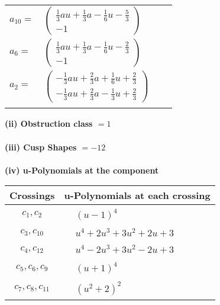 \documentclass[1p]{elsarticle_modified}
\theoremstyle{definition}
\begin{document}
\begin{tabular}{m{7pt} m{180pt} m{7pt} m{180pt} }
\flushright $a_{10}=$&$\begin{pmatrix}\frac{1}{3} a u+\frac{1}{3} a-\frac{1}{6} u-\frac{5}{3}\\-1\end{pmatrix}$ \\
\flushright $a_{6}=$&$\begin{pmatrix}\frac{1}{3} a u+\frac{1}{3} a-\frac{1}{6} u-\frac{2}{3}\\-1\end{pmatrix}$ \\
\flushright $a_{2}=$&$\begin{pmatrix}-\frac{1}{3} a u+\frac{2}{3} a+\frac{1}{6} u+\frac{2}{3}\\-\frac{1}{3} a u+\frac{2}{3} a-\frac{1}{3} u+\frac{2}{3}\end{pmatrix}$\\&\end{tabular}
\flushleft \textbf{(ii) Obstruction class $= 1$}\\~\\
\flushleft \textbf{(iii) Cusp Shapes $= -12$}\\~\\
\newpage\renewcommand{\arraystretch}{1}
\flushleft \textbf{(iv) u-Polynomials at the component}\newline \\
\begin{tabular}{m{50pt}|m{274pt}}
Crossings & \hspace{64pt}u-Polynomials at each crossing \\
\hline $$\begin{aligned}c_{1},c_{2}\end{aligned}$$&$\begin{aligned}
&(u-1)^4
\end{aligned}$\\
\hline $$\begin{aligned}c_{3},c_{10}\end{aligned}$$&$\begin{aligned}
&u^4+2 u^3+3 u^2+2 u+3
\end{aligned}$\\
\hline $$\begin{aligned}c_{4},c_{12}\end{aligned}$$&$\begin{aligned}
&u^4-2 u^3+3 u^2-2 u+3
\end{aligned}$\\
\hline $$\begin{aligned}c_{5},c_{6},c_{9}\end{aligned}$$&$\begin{aligned}
&(u+1)^4
\end{aligned}$\\
\hline $$\begin{aligned}c_{7},c_{8},c_{11}\end{aligned}$$&$\begin{aligned}
&(u^2+2)^2
\end{aligned}$\\
\hline
\end{tabular}\\~\\
\end{document}
